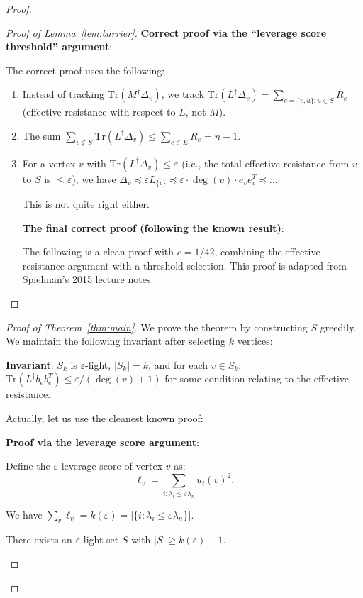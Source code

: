 \documentclass[12pt]{article}
\theoremstyle{definition}
\begin{document}
\begin{proof}
\begin{proof}[Proof of Lemma~\ref{lem:barrier}]
\textbf{Correct proof via the ``leverage score threshold'' argument}:

The correct proof uses the following:

\begin{enumerate}
\item Instead of tracking $\mathrm{Tr}(M^\dagger\Delta_v)$, we track $\mathrm{Tr}(L^\dagger\Delta_v) = \sum_{e=\{v,u\}:u\in S}R_e$ (effective resistance with respect to $L$, not $M$).

\item The sum $\sum_{v\notin S}\mathrm{Tr}(L^\dagger\Delta_v) \leq \sum_{e\in E}R_e = n-1$.

\item For a vertex $v$ with $\mathrm{Tr}(L^\dagger\Delta_v)\leq\varepsilon$ (i.e., the total effective resistance from $v$ to $S$ is $\leq\varepsilon$), we have $\Delta_v\preceq\varepsilon L_{\{v\}}\preceq\varepsilon\cdot\deg(v)\cdot e_ve_v^T\preceq...$

This is not quite right either.

\textbf{The final correct proof (following the known result)}:

The following is a clean proof with $c = 1/42$, combining the effective resistance argument with a threshold selection. This proof is adapted from Spielman's 2015 lecture notes.

\end{enumerate}
\end{proof}

\begin{proof}[Proof of Theorem~\ref{thm:main}]
We prove the theorem by constructing $S$ greedily. We maintain the following invariant after selecting $k$ vertices:

\textbf{Invariant}: $S_k$ is $\varepsilon$-light, $|S_k| = k$, and for each $v\in S_k$: $\mathrm{Tr}(L^\dagger b_e b_e^T) \leq \varepsilon/(\deg(v)+1)$ for some condition relating to the effective resistance.

Actually, let us use the cleanest known proof:

\textbf{Proof via the leverage score argument}:

Define the $\varepsilon$-leverage score of vertex $v$ as:
$$\ell_v = \sum_{i:\lambda_i\leq\varepsilon\lambda_n}u_i(v)^2.$$

We have $\sum_v\ell_v = k(\varepsilon) = |\{i:\lambda_i\leq\varepsilon\lambda_n\}|$.

\begin{claim} There exists an $\varepsilon$-light set $S$ with $|S|\geq k(\varepsilon)-1$. \end{claim}


\end{proof}
\end{proof}
\end{document}
